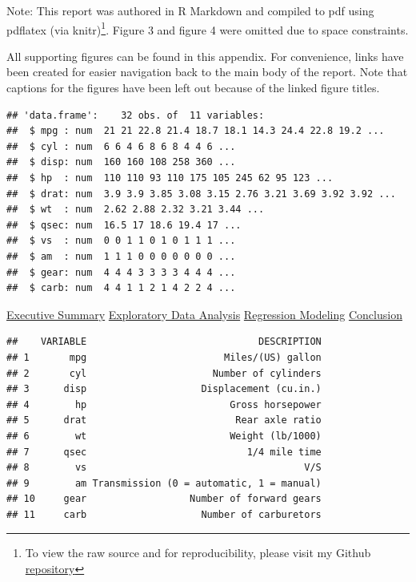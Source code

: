 \documentclass[10pt,]{article}
\let\rmarkdownfootnote\footnote%
\def\footnote{\protect\rmarkdownfootnote}
\begin{document}
Note: This report was authored in R Markdown and compiled to pdf using
pdflatex (via knitr)\footnote{To view the raw source and for
  reproducibility, please visit my Github
  \href{https://github.com/AmbroseT/RegressionModels}{repository}}.
Figure 3 and figure 4 were omitted due to space constraints.

\newpage


All supporting figures can be found in this appendix. For convenience,
links have been created for easier navigation back to the main body of
the report. Note that captions for the figures have been left out
because of the linked figure titles.


\begin{verbatim}
## 'data.frame':    32 obs. of  11 variables:
##  $ mpg : num  21 21 22.8 21.4 18.7 18.1 14.3 24.4 22.8 19.2 ...
##  $ cyl : num  6 6 4 6 8 6 8 4 4 6 ...
##  $ disp: num  160 160 108 258 360 ...
##  $ hp  : num  110 110 93 110 175 105 245 62 95 123 ...
##  $ drat: num  3.9 3.9 3.85 3.08 3.15 2.76 3.21 3.69 3.92 3.92 ...
##  $ wt  : num  2.62 2.88 2.32 3.21 3.44 ...
##  $ qsec: num  16.5 17 18.6 19.4 17 ...
##  $ vs  : num  0 0 1 1 0 1 0 1 1 1 ...
##  $ am  : num  1 1 1 0 0 0 0 0 0 0 ...
##  $ gear: num  4 4 4 3 3 3 3 4 4 4 ...
##  $ carb: num  4 4 1 1 2 1 4 2 2 4 ...
\end{verbatim}

\hyperref[eo]{Executive Summary} \textbar{} \hyperref[eda]{Exploratory
Data Analysis} \textbar{} \hyperref[rm]{Regression Modeling} \textbar{}
\hyperref[conclusion]{Conclusion}


\begin{verbatim}
##    VARIABLE                              DESCRIPTION
## 1       mpg                        Miles/(US) gallon
## 2       cyl                      Number of cylinders
## 3      disp                    Displacement (cu.in.)
## 4        hp                         Gross horsepower
## 5      drat                          Rear axle ratio
## 6        wt                         Weight (lb/1000)
## 7      qsec                            1/4 mile time
## 8        vs                                      V/S
## 9        am Transmission (0 = automatic, 1 = manual)
## 10     gear                  Number of forward gears
## 11     carb                    Number of carburetors
\end{verbatim}
\end{document}
